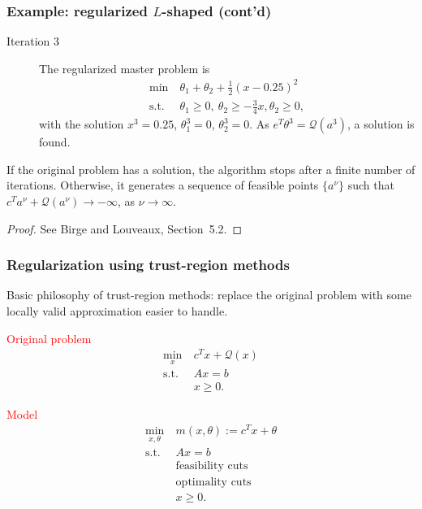 \documentclass[aspectratio=169]{beamer}
\begin{document}
\begin{frame}
\frametitle{Example: regularized $L$-shaped (cont'd)}

\begin{description}
\item[Iteration 3]
The regularized master problem is
\begin{align*}
\min\ & \theta_1 + \theta_2 + \frac{1}{2}(x-0.25)^2 \\
\text{s.t. } & \theta_1 \geq 0,\ \theta_2 \geq -\frac{3}{4}x, \theta_2 \geq 0,
\end{align*}
with the solution $x^3 = 0.25$, $\theta_1^3 = 0$, $\theta_2^3 = 0$.
As $e^T\theta^3 = \mathcal{Q}(a^3)$, a solution is found.
\end{description}

\begin{theorem}
If the original problem has a solution, the algorithm stops after a finite number of iterations.
Otherwise, it generates a sequence of feasible points $\lbrace a^{\nu} \rbrace$ such that
$c^Ta^{\nu} + \mathcal{Q}(a^{\nu}) \rightarrow -\infty$, as $\nu \rightarrow \infty$.
\end{theorem}
\begin{proof}
See Birge and Louveaux, Section~5.2.
\end{proof}
\end{frame}

\begin{frame}
\frametitle{Regularization using trust-region methods}

{\blue Basic philosophy} of trust-region methods: replace the original problem with some locally valid approximation easier to handle.

\mbox{}

\begin{center}
\begin{minipage}[t]{0.49\textwidth}
\centering
\textcolor{red}{Original problem}
\begin{align*}
	\min_x \ & c^T x + \mathcal{Q}(x) \\
	\text{s.t. } & Ax = b \\
	& x \geq 0.
\end{align*}
\end{minipage}
\begin{minipage}[t]{0.49\textwidth}
\centering
\textcolor{red}{Model}
\begin{align*}
	\min_{x, \theta} \ & m(x, \theta) := c^T x + \theta \\
	\text{s.t. } & Ax = b \\
	& \text{feasibility cuts} \\
	& \text{optimality cuts} \\
	& x \geq 0.
\end{align*}
\end{minipage}
\end{center}

\end{frame}
\end{document}
